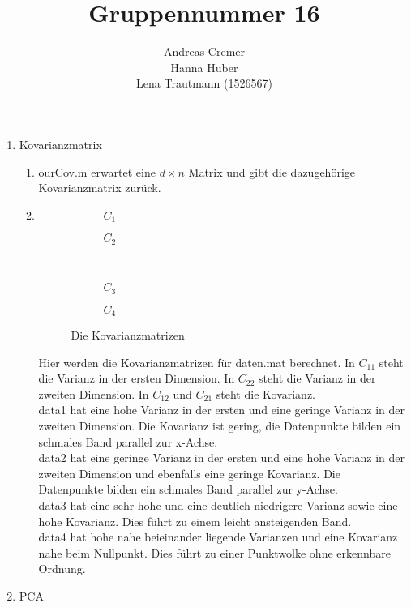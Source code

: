 \documentclass[]{report}
\title{Gruppennummer 16}
\author{Andreas Cremer\\Hanna Huber\\Lena Trautmann (1526567)}
\newlength\figureheight
\newlength\figurewidth
\begin{document}
	\maketitle
	
	
	\begin{enumerate}
		\item Kovarianzmatrix
		\begin{enumerate}
			\item
			ourCov.m erwartet eine $d \times n$ Matrix und gibt die dazugehörige Kovarianzmatrix zurück.
			\item
			\setlength\figureheight{5cm}
			\setlength{}
			\begin{figure}
				\begin{subfigure}{0.45\textwidth}
					\centering
					
					\caption{$C_{1}$}
					\label{fig:cov1}
				\end{subfigure}
				\qquad
				\begin{subfigure}{0.45\textwidth}
					\centering
					
					\caption{$C_{2}$}
					\label{fig:cov2}
				\end{subfigure}	
				\\
				\begin{subfigure}{0.45\textwidth}
					\centering
					
					\caption{$C_{3}$}
					\label{fig:cov3}
				\end{subfigure}
				\qquad
				\begin{subfigure}{0.45\textwidth}
					\centering
					
					\caption{$C_{4}$}
					\label{fig:cov4}
				\end{subfigure}	
				\caption{Die Kovarianzmatrizen}
				\label{fig:cov}
			\end{figure}
			
			Hier werden die Kovarianzmatrizen für daten.mat berechnet. In $C_{11}$ steht die Varianz in der ersten Dimension. In $C_{22}$ steht die Varianz in der zweiten Dimension. In $C_{12}$ und $C_{21}$ steht die Kovarianz.\\
			data1 hat eine hohe Varianz in der ersten und eine geringe Varianz in der zweiten Dimension. Die Kovarianz ist gering, die Datenpunkte bilden ein schmales Band parallel zur x-Achse.\\
			data2 hat eine geringe Varianz in der ersten und eine hohe Varianz in der zweiten Dimension und ebenfalls eine geringe Kovarianz. Die Datenpunkte bilden ein schmales Band parallel zur y-Achse.\\
			data3 hat eine sehr hohe und eine deutlich niedrigere Varianz sowie eine hohe Kovarianz. Dies führt zu einem leicht ansteigenden Band.\\
			data4 hat hohe nahe beieinander liegende Varianzen und eine Kovarianz nahe beim Nullpunkt. Dies führt zu einer Punktwolke ohne erkennbare Ordnung.
		\end{enumerate}
		\item PCA\\
		

\end{enumerate}
\end{document}
